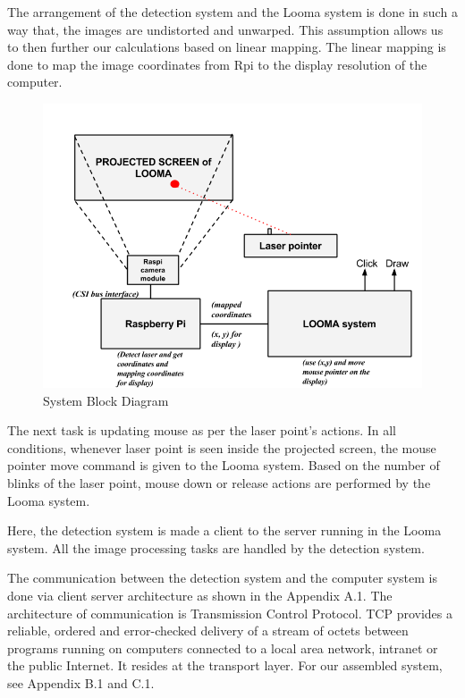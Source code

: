 \documentclass[12pt, a4paper]{article}
\begin{document}
The arrangement of the detection system and the Looma system is done in such a way that, the images are undistorted and unwarped. This assumption allows us to then further our calculations based on linear mapping. The linear mapping is done to map the image coordinates from Rpi to the display resolution of the computer.
\newpage

\begin{figure}[htp]
\centering
\includegraphics[scale=0.61]{proposed_system}
\caption{System Block Diagram}
\label{Block Diagram}
\end{figure}
The next task is updating mouse as per the laser point's actions. In all conditions, whenever laser point is seen inside the projected screen, the mouse pointer move command is given to the Looma system. Based on the number of blinks of the laser point, mouse down or release actions are performed by the Looma system. 

Here, the detection system is made a client to the server running in the Looma system. All the image processing tasks are handled by the detection system. 

The communication between the detection system and the computer system is done via client server architecture as shown in the Appendix A.1. The architecture of communication is Transmission Control Protocol. TCP provides a reliable, ordered and error-checked delivery of a stream of octets between programs running on computers connected to a local area network, intranet or the public Internet. It resides at the transport layer. For our assembled system, see Appendix B.1 and C.1.
\newpage
\end{document}
